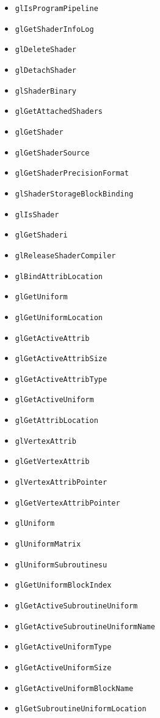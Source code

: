 \documentclass[12pt]{article}
\begin{document}
\begin{itemize}
\item \texttt{glIsProgramPipeline}
\item \texttt{glGetShaderInfoLog}
\item \texttt{glDeleteShader}
\item \texttt{glDetachShader}
\item \texttt{glShaderBinary}
\item \texttt{glGetAttachedShaders}
\item \texttt{glGetShader}
\item \texttt{glGetShaderSource}
\item \texttt{glGetShaderPrecisionFormat}
\item \texttt{glShaderStorageBlockBinding}
\item \texttt{glIsShader}
\item \texttt{glGetShaderi}
\item \texttt{glReleaseShaderCompiler}
\item \texttt{glBindAttribLocation}
\item \texttt{glGetUniform}
\item \texttt{glGetUniformLocation}
\item \texttt{glGetActiveAttrib}
\item \texttt{glGetActiveAttribSize}
\item \texttt{glGetActiveAttribType}
\item \texttt{glGetActiveUniform}
\item \texttt{glGetAttribLocation}
\item \texttt{glVertexAttrib}
\item \texttt{glGetVertexAttrib}
\item \texttt{glVertexAttribPointer}
\item \texttt{glGetVertexAttribPointer}
\item \texttt{glUniform}
\item \texttt{glUniformMatrix}
\item \texttt{glUniformSubroutinesu}
\item \texttt{glGetUniformBlockIndex}
\item \texttt{glGetActiveSubroutineUniform}
\item \texttt{glGetActiveSubroutineUniformName}
\item \texttt{glGetActiveUniformType}
\item \texttt{glGetActiveUniformSize}
\item \texttt{glGetActiveUniformBlockName}
\item \texttt{glGetSubroutineUniformLocation}

\end{itemize}
\end{document}
